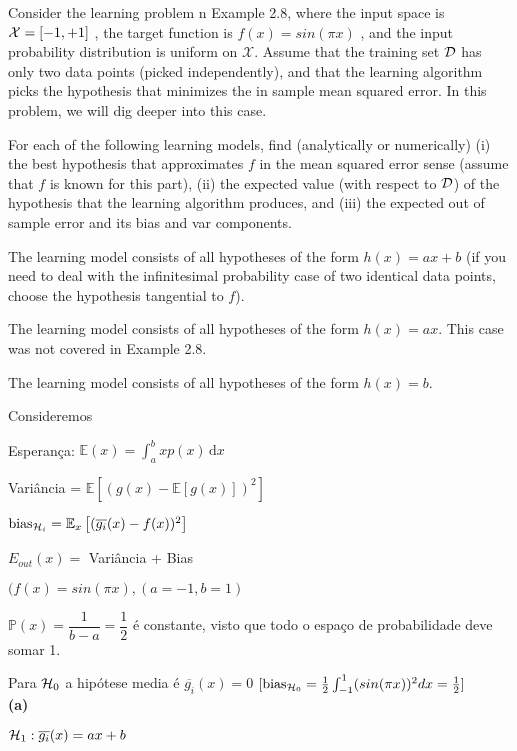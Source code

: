 \begin{enunciado}{23}
   Consider the learning problem  n Example 2.8, where the input space is $\mathcal{X} = [-1, + 1]$ , the target function is $f(x) = sin(\pi x)$ , and the input probability distribution is uniform on $\mathscr{X}$. Assume that the training set $\mathcal{D}$ has only two data points (picked independently), and that the learning algorithm picks the hypothesis that minimizes the in sample mean squared error. In this problem, we will dig deeper into this case.
   
For each of the following learning models, find (analytically or numerically)
(i) the best hypothesis that approximates $f$ in the mean squared error sense
(assume that $f$ is known for this part), (ii) the expected value (with respect
to $\mathcal{D}$) of the hypothesis that the learning algorithm produces, and (iii) the expected out of sample error and its bias and var components.

 The learning model consists of all hypotheses of the form $h(x) = ax + b$
(if you need to deal with the infinitesimal probability case of two identical data points, choose the hypothesis tangential to $f$).

 The learning model consists of all hypotheses of the form $h(x) = ax$. This case was not covered in Example 2.8.

 The learning model consists of all hypotheses of the form $h(x) = b$.
   
\end{enunciado}

Consideremos 

Esperança:	$\mathbb{E}(x) = \int_a^b \! x p(x)\, \mathrm{d}x $

Variância = $\mathbb{E}[(g(x) - \mathbb{E}[g(x)])^2]$

$\text{bias}_{{\cal H}_i} = \mathbb{E}_x \left[ (\overline{g_i}(x) - f(x))^2 \right]$

$E_{out} (x) =$ Variância + Bias

$( f(x)=sin(\pi x), (a=-1, b=1) $

$\mathbb{P}(x) = \dfrac{1}{b-a}= \dfrac{1}{2}$ é constante, visto que todo o espaço de probabilidade deve somar 1.

Para  $\mathcal{H}_0$ a hipótese media é $\overline{g_i}(x) = 0 $ $[ \text{bias}_{{\cal H}_0} = \frac{1}{2} \int_{-1}^{1} (sin(\pi x))^2 dx = \frac{1}{2} ]$
\\

\textbf{(a)} 

$\mathcal{H}_1: \overline{g_i}(x) = ax + b$

